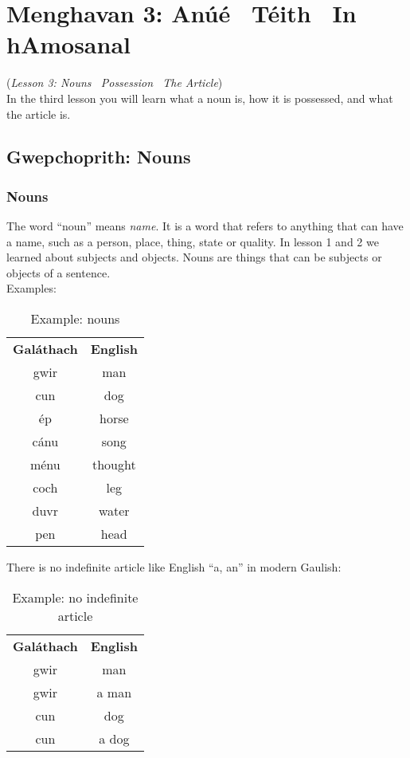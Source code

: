 \section{Menghavan 3: An\'{u}\'{e} \textendash\ T\'{e}ith \textendash\ In hAmosanal}
(\textit{Lesson 3: Nouns \textendash\ Possession \textendash\ The Article})\\

In the third lesson you will learn what a noun is, how it is possessed, and what the article is.\\

\subsection{Gwepchoprith: Nouns}
\subsubsection{Nouns}

The word ``noun'' means \textit{name}. It is a word that refers to anything that can have a name, such as a person, place, thing, state or quality. In lesson 1 and 2 we learned about subjects and objects. Nouns are things that can be subjects or objects of a sentence.\\

Examples:
\begin{table}[H]
\centering
\begin{tabular}{cc}
  \toprule
  \textbf{Gal\'{a}thach} & \textbf{English}\\
  \cmidrule(lr){1-1}\cmidrule(lr){2-2}
  gwir & man\\
  cun & dog\\
  \'{e}p & horse\\
  c\'{a}nu & song\\
  m\'{e}nu & thought\\
  coch & leg\\
  duvr & water\\
  pen & head\\
  \bottomrule
\end{tabular}
\caption{Example: nouns}
\label{example_nouns}
\end{table}

There is no indefinite article like English ``a, an'' in modern Gaulish:
\begin{table}[H]
\centering
\begin{tabular}{cc}
  \toprule
  \textbf{Gal\'{a}thach} & \textbf{English}\\
  \cmidrule(lr){1-1}\cmidrule(lr){2-2}
  gwir & man\\
  gwir & a man\\
  cun & dog\\
  cun & a dog\\
  \bottomrule
\end{tabular}
\caption{Example: no indefinite article}
\label{example_no_indefinite_article}
\end{table}

